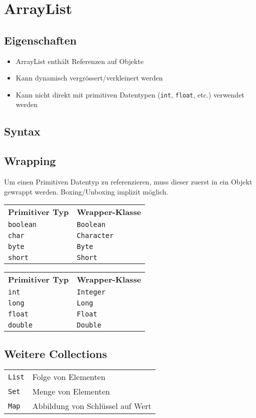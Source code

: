 \section{ArrayList}
\subsection{Eigenschaften}
\begin{itemize}
    \item ArrayList enthält Referenzen auf Objekte
    \item Kann dynamisch vergrössert/verkleinert werden
    \item Kann nicht direkt mit primitiven Datentypen (\lstinline{int}, \lstinline{float}, etc.) verwendet werden
\end{itemize}

\subsection{Syntax}

\subsection{Wrapping}
Um einen Primitiven Datentyp zu referenzieren, muss dieser zuerst in ein Objekt gewrappt werden.
Boxing/Unboxing implizit möglich.
\vspace{-0.8\abovedisplayskip}
\begin{center}
    \begin{tabularx}{0.45\columnwidth}{@{}l l@{}}
        \textbf{Primitiver Typ} & \textbf{Wrapper-Klasse}\\\hhline{==}
        \lstinline{boolean} & \lstinline{Boolean}\\\hhline{--}
        \lstinline{char} & \lstinline{Character}\\\hhline{--}
        \lstinline{byte} & \lstinline{Byte}\\\hhline{--}
        \lstinline{short} & \lstinline{Short}\\
    \end{tabularx}
    \begin{tabularx}{0.45\columnwidth}{@{}l l@{}}
        \textbf{Primitiver Typ} & \textbf{Wrapper-Klasse}\\\hhline{==}
        \lstinline{int} & \lstinline{Integer}\\\hhline{--}
        \lstinline{long} & \lstinline{Long}\\\hhline{--}
        \lstinline{float} & \lstinline{Float}\\\hhline{--}
        \lstinline{double} & \lstinline{Double}\\
    \end{tabularx}
\end{center}
    
\subsection{Weitere Collections}
\begin{tabular}{@{}l l@{}}
    \lstinline!List! &Folge von Elementen\\
    \lstinline!Set! &Menge von Elementen\\
    \lstinline!Map! &Abbildung von Schlüssel auf Wert
\end{tabular}
